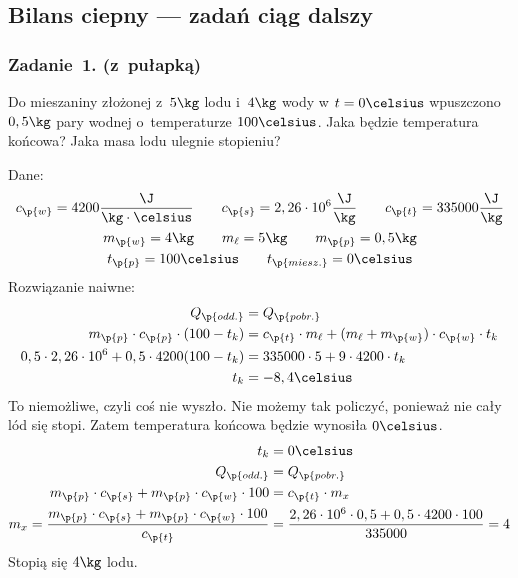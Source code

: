\subsection*{Bilans ciepny --- zadań ciąg dalszy}
\subsubsection*{Zadanie~1. (z~pułapką)}
\begin{statement}
    Do mieszaniny złożonej z~\(5\kg\) lodu i~\(4\kg\) wody w \(t = 0\celsius\) wpuszczono \(0,5\kg\) pary wodnej o~temperaturze \(100\celsius\). Jaka będzie temperatura końcowa? Jaka masa lodu ulegnie stopieniu?
\end{statement}
Dane:
\begin{gather*}
    c_\p{w} = 4200\frac{\J}{\kg \cdot \celsius} \qquad c_\p{s} = 2,26 \cdot 10^6\frac{\J}{\kg} \qquad c_\p{t} = 335000\frac{\J}{\kg}\\
    m_\p{w} = 4\kg \qquad m_\ell = 5\kg \qquad m_\p{p} = 0,5\kg\\
    t_\p{p} = 100\celsius \qquad t_\p{miesz.} = 0\celsius
\end{gather*}
Rozwiązanie naiwne:
\begin{align*}
    Q_\p{odd.} &= Q_\p{pobr.}\\
    m_\p{p} \cdot c_\p{p} \cdot (100 - t_k) &= c_\p{t} \cdot m_\ell + (m_\ell + m_\p{w}) \cdot c_\p{w} \cdot t_k\\
    0,5 \cdot 2,26 \cdot 10^6 + 0,5 \cdot 4200 (100 - t_k) &= 335000 \cdot 5 + 9 \cdot 4200 \cdot t_k\\
    t_k &= -8,4\celsius
\end{align*}
To niemożliwe, czyli coś nie wyszło. Nie możemy tak policzyć, ponieważ nie cały lód się stopi. Zatem temperatura końcowa będzie wynosiła \(0\celsius\).
\begin{align*}
    t_k &= 0\celsius\\
    Q_\p{odd.} &= Q_\p{pobr.}\\
    m_\p{p} \cdot c_\p{s} + m_\p{p} \cdot c_\p{w} \cdot 100 &= c_\p{t} \cdot m_x\\
    m_x = \frac{m_\p{p} \cdot c_\p{s} + m_\p{p} \cdot c_\p{w} \cdot 100}{c_\p{t}}
        &= \frac{2,26 \cdot 10^6 \cdot 0,5 + 0,5 \cdot 4200 \cdot 100}{335000}
        = 4
\end{align*}
Stopią się \(4\kg\) lodu.

